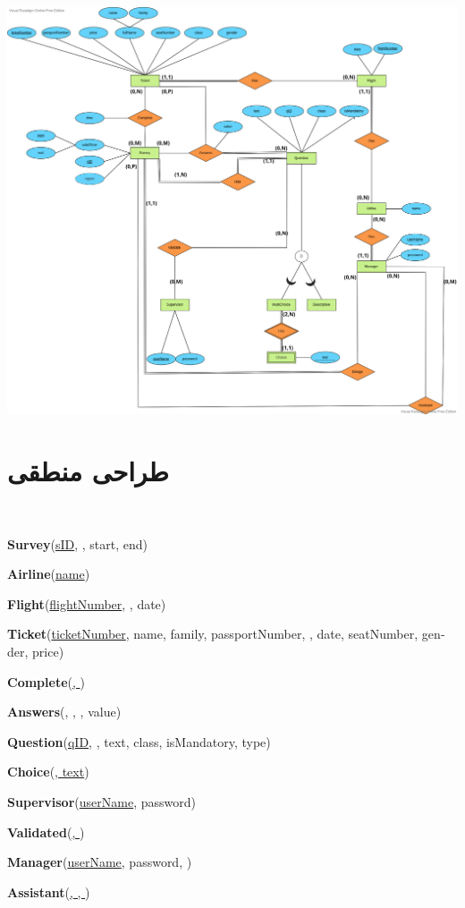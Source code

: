 \documentclass[a4paper,12pt]{article}
\begin{document}
\begin{center}
	\includegraphics[scale=0.3]{ERD.png}
\end{center}

\section*{طراحی منطقی}

\begin{latin}
\

\textbf{Survey}(\underline{sID}, , start, end)
\smallskip

\textbf{Airline}(\underline{name})
\smallskip

\textbf{Flight}(\underline{flightNumber}, , date)
\smallskip

\textbf{Ticket}(\underline{ticketNumber}, name, family, passportNumber, , date, seatNumber, gender, price)
\smallskip

\textbf{Complete}(\underline{, })
\smallskip

\textbf{Answers}(, , , value)
\smallskip

\textbf{Question}(\underline{qID}, , text, class, isMandatory, type)
\smallskip

\textbf{Choice}(\underline{, text})
\smallskip

\textbf{Supervisor}(\underline{userName}, password)
\smallskip

\textbf{Validated}(\underline{, })
\smallskip

\textbf{Manager}(\underline{userName}, password, )
\smallskip

\textbf{Assistant}(\underline{, , })
\smallskip

\end{latin}
\end{document}
